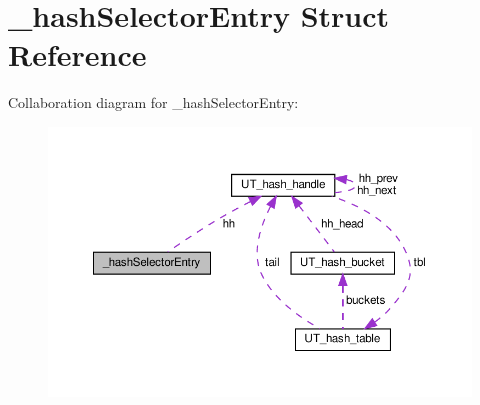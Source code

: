\hypertarget{struct__hashSelectorEntry}{}\section{\+\_\+hash\+Selector\+Entry Struct Reference}
\label{struct__hashSelectorEntry}


Collaboration diagram for \+\_\+hash\+Selector\+Entry\+:
\nopagebreak
\begin{figure}[H]
\begin{center}
\leavevmode
\includegraphics[width=350pt]{struct__hashSelectorEntry__coll__graph}
\end{center}
\end{figure}
